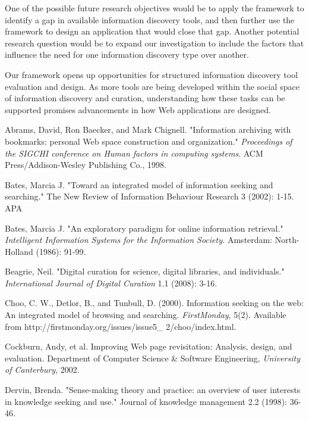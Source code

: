 \documentclass{casconpaper}
\begin{document}
{{One of the possible future research objectives would be to apply the framework to identify a gap in available information discovery tools, and then further use the framework to design an application that would close that gap. Another potential research question would be to expand our investigation to include the factors that influence the need for one information discovery type over another. 

Our framework opens up opportunities for structured information discovery tool evaluation and design. As more tools are being developed within the social space of information discovery and curation, understanding how these tasks can be supported promises advancements in how Web applications are designed.

} %

{\begin{thebibliography}{9}
Abrams, David, Ron Baecker, and Mark Chignell. "Information archiving with bookmarks: personal Web space construction and organization." \emph{Proceedings of the SIGCHI conference on Human factors in computing systems}. ACM Press/Addison-Wesley Publishing Co., 1998.

Bates, Marcia J. "Toward an integrated model of information seeking and searching." The New Review of Information Behaviour Research 3 (2002): 1-15.
APA	

Bates, Marcia J. "An exploratory paradigm for online information retrieval." \emph{Intelligent Information Systems for the Information Society.} Amsterdam: North-Holland (1986): 91-99.

Beagrie, Neil. "Digital curation for science, digital libraries, and individuals." \emph{International Journal of Digital Curation} 1.1 (2008): 3-16.

Choo, C. W., Detlor, B., and Tunbull, D. (2000). Information seeking on the web: An integrated model of browsing and searching.  \emph{FirstMonday}, 5(2). Available from http://firstmonday.org/issues/issue5\_
2/choo/index.html.

Cockburn, Andy, et al. Improving Web page revisitation: Analysis, design, and evaluation. Department of Computer Science \& Software Engineering, \emph{University of Canterbury}, 2002.

Dervin, Brenda. "Sense-making theory and practice: an overview of user interests in knowledge seeking and use." Journal of knowledge management 2.2 (1998): 36-46.


\end{thebibliography}}}
\end{document}
